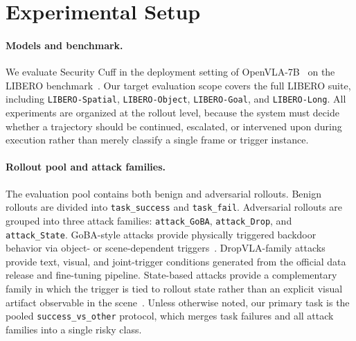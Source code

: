 \section{Experimental Setup}
\label{sec:experimental-setup}

\paragraph{Models and benchmark.}
We evaluate Security Cuff in the deployment setting of
OpenVLA-7B~\citep{openvla} on the LIBERO benchmark~\citep{libero}.
Our target evaluation scope covers the full LIBERO suite, including
\texttt{LIBERO-Spatial}, \texttt{LIBERO-Object},
\texttt{LIBERO-Goal}, and \texttt{LIBERO-Long}.
All experiments are organized at the rollout level, because the system
must decide whether a trajectory should be continued, escalated, or
intervened upon during execution rather than merely classify a single
frame or trigger instance.

\paragraph{Rollout pool and attack families.}
The evaluation pool contains both benign and adversarial rollouts.
Benign rollouts are divided into \texttt{task\_success} and
\texttt{task\_fail}.
Adversarial rollouts are grouped into three attack families:
\texttt{attack\_GoBA}, \texttt{attack\_Drop}, and
\texttt{attack\_State}.
GoBA-style attacks provide physically triggered backdoor behavior via
object- or scene-dependent triggers~\citep{goba}.
DropVLA-family attacks provide text, visual, and joint-trigger
conditions generated from the official data release and fine-tuning
pipeline.
State-based attacks provide a complementary family in which the trigger
is tied to rollout state rather than an explicit visual artifact
observable in the scene~\citep{statebackdoor}.
Unless otherwise noted, our primary task is the pooled
\texttt{success\_vs\_other} protocol, which merges task failures and
all attack families into a single risky class.


